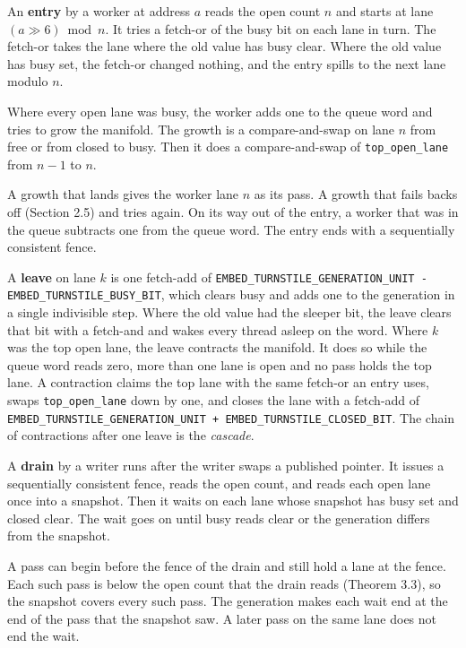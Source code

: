 An \textbf{entry} by a worker at address \(a\) reads the open count \(n\) and starts at lane \((a \gg 6) \bmod n\). It tries a fetch-or of the busy bit on each lane in turn. The fetch-or takes the lane where the old value has busy clear. Where the old value has busy set, the fetch-or changed nothing, and the entry spills to the next lane modulo \(n\).

Where every open lane was busy, the worker adds one to the queue word and tries to grow the manifold. The growth is a compare-and-swap on lane \(n\) from free or from closed to busy. Then it does a compare-and-swap of \texttt{top\_\allowbreak{}open\_\allowbreak{}lane} from \(n - 1\) to \(n\).

A growth that lands gives the worker lane \(n\) as its pass. A growth that fails backs off (Section 2.5) and tries again. On its way out of the entry, a worker that was in the queue subtracts one from the queue word. The entry ends with a sequentially consistent fence.

A \textbf{leave} on lane \(k\) is one fetch-add of \texttt{EMBED\_\allowbreak{}TURNSTILE\_\allowbreak{}GENERATION\_\allowbreak{}UNIT -\allowbreak{} EMBED\_\allowbreak{}TURNSTILE\_\allowbreak{}BUSY\_\allowbreak{}BIT}, which clears busy and adds one to the generation in a single indivisible step. Where the old value had the sleeper bit, the leave clears that bit with a fetch-and and wakes every thread asleep on the word. Where \(k\) was the top open lane, the leave contracts the manifold. It does so while the queue word reads zero, more than one lane is open and no pass holds the top lane. A contraction claims the top lane with the same fetch-or an entry uses, swaps \texttt{top\_\allowbreak{}open\_\allowbreak{}lane} down by one, and closes the lane with a fetch-add of \texttt{EMBED\_\allowbreak{}TURNSTILE\_\allowbreak{}GENERATION\_\allowbreak{}UNIT + EMBED\_\allowbreak{}TURNSTILE\_\allowbreak{}CLOSED\_\allowbreak{}BIT}. The chain of contractions after one leave is the \emph{cascade}.

A \textbf{drain} by a writer runs after the writer swaps a published pointer. It issues a sequentially consistent fence, reads the open count, and reads each open lane once into a snapshot. Then it waits on each lane whose snapshot has busy set and closed clear. The wait goes on until busy reads clear or the generation differs from the snapshot.

A pass can begin before the fence of the drain and still hold a lane at the fence. Each such pass is below the open count that the drain reads (Theorem 3.3), so the snapshot covers every such pass. The generation makes each wait end at the end of the pass that the snapshot saw. A later pass on the same lane does not end the wait.

